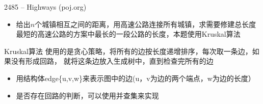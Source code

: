 \begin{frame}{2485 -- Highways (poj.org)}
    \begin{itemize}
        \item 给出$n$个城镇相互之间的距离，用高速公路连接所有城镇，求需要修建总长度最短的高速公路的方案中最长的一段公路的长度，本题使用Kruskal算法
    \end{itemize}    
    \begin{block}{Kruskal算法}
        使用的是贪心策略，将所有的边按长度递增排序，每次取一条边，如果没有形成回路， 就将这条边放入生成树中，直到检查完所有的边
    \end{block}
    \begin{itemize}
        \item 用结构体edge\{u,v,w\}来表示图中的边(u，v为边的两个端点，w为边的长度）
        \item 是否存在回路的判断，可以使用并查集来实现
    \end{itemize}
\end{frame}    
